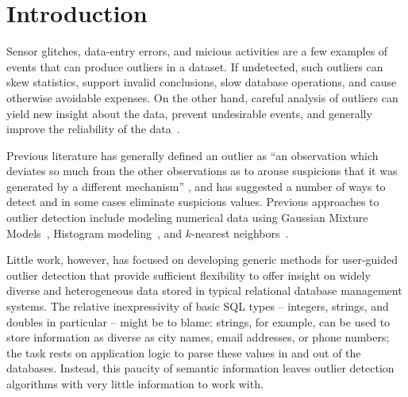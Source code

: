 \section{Introduction}
\label{sec:intro}


Sensor glitches, data-entry errors, and micious activities are a few examples of events that can produce outliers in a dataset. If undetected, such outliers can skew statistics, support invalid conclusions, slow database operations, and cause otherwise avoidable expenses. On the other hand, careful analysis of outliers can yield new insight about the data, prevent undesirable events, and generally improve the reliability of the data~\cite{Achour2014}.

Previous literature has generally defined an outlier as ``an observation which deviates so much from the other observations as to arouse suspicions that it was generated by a different mechanism'' \cite{Hawkins1980}, and has suggested a number of ways to detect and in some cases eliminate suspicious values. Previous approaches to outlier detection include modeling numerical data using Gaussian Mixture Models~\cite{Lu2005,Roberts1994,Roberts1999}, Histogram modeling~\cite{Gebski2007,Sheng2007}, and $k$-nearest neighbors~\cite{Ramaswamy2000}.

Little work, however, has focused on developing generic methods for user-guided outlier detection that provide sufficient flexibility to offer insight on widely diverse and heterogeneous data stored in typical relational database management systems. The relative inexpressivity of basic SQL types -- integers, strings, and doubles in particular -- might be to blame: strings, for example, can be used to store information as diverse as city names, email addresses, or phone numbers; the task rests on application logic to parse these values in and out of the databases. Instead, this paucity of semantic information leaves outlier detection algorithms with very little information to work with.

